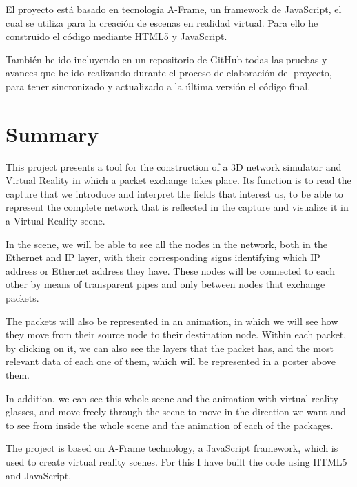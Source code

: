 \documentclass[a4paper, 12pt]{book}
\begin{document}
El proyecto está basado en tecnología A-Frame, un framework de JavaScript, el cual se utiliza para la creación de escenas en realidad virtual. Para ello he construido el código mediante HTML5 y JavaScript.

También he ido incluyendo en un repositorio de GitHub todas las pruebas y avances que he ido realizando durante el proceso de elaboración del proyecto, para tener sincronizado y actualizado a la última versión el código final.


\chapter*{Summary}

This project presents a tool for the construction of a 3D network simulator and Virtual Reality in which a packet exchange takes place. Its function is to read the capture that we introduce and interpret the fields that interest us, to be able to represent the complete network that is reflected in the capture and visualize it in a Virtual Reality scene.

In the scene, we will be able to see all the nodes in the network, both in the Ethernet and IP layer, with their corresponding signs identifying which IP address or Ethernet address they have.
These nodes will be connected to each other by means of transparent pipes and only between nodes that exchange packets.

The packets will also be represented in an animation, in which we will see how they move from their source node to their destination node. Within each packet, by clicking on it, we can also see the layers that the packet has, and the most relevant data of each one of them, which will be represented in a poster above them.

In addition, we can see this whole scene and the animation with virtual reality glasses, and move freely through the scene to move in the direction we want and to see from inside the whole scene and the animation of each of the packages.

The project is based on A-Frame technology, a JavaScript framework, which is used to create virtual reality scenes. For this I have built the code using HTML5 and JavaScript.
\end{document}
